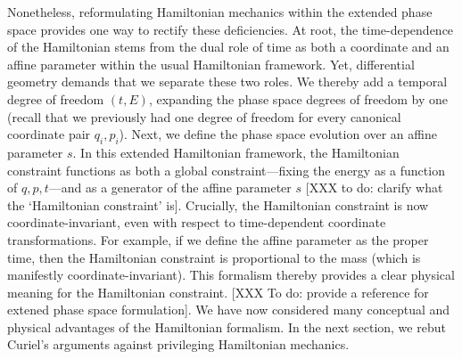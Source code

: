 \documentclass[letterpaper]{article}
\begin{document}
Nonetheless, reformulating Hamiltonian mechanics within the extended phase space provides one way to rectify these deficiencies. At root, the time-dependence of the Hamiltonian stems from the dual role of time as both a coordinate and an affine parameter within the usual Hamiltonian framework. Yet, differential geometry demands that we separate these two roles. We thereby add a temporal degree of freedom $(t, E) $, expanding the phase space degrees of freedom by one (recall that we previously had one degree of freedom for every canonical coordinate pair $q_i, p_i$). Next, we define the phase space evolution over an affine parameter $s $. In this extended Hamiltonian framework, the Hamiltonian constraint functions as both a global constraint---fixing the energy as a function of $q, p, t $---and as a generator of the affine parameter $s $ [XXX to do: clarify what the `Hamiltonian constraint' is]. Crucially, the Hamiltonian constraint is now coordinate-invariant, even with respect to time-dependent coordinate transformations. For example, if we define the affine parameter as the proper time, then the Hamiltonian constraint is proportional to the mass (which is manifestly coordinate-invariant). This formalism thereby provides a clear physical meaning for the Hamiltonian constraint. [XXX To do: provide a reference for extened phase space formulation]. We have now considered many conceptual and physical advantages of the Hamiltonian formalism. In the next section, we rebut Curiel's \parencites*[]{Curiel} arguments against privileging Hamiltonian mechanics. 


\end{document}
